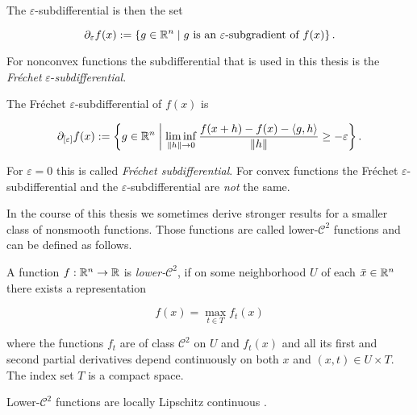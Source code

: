 The \(\varepsilon\)-subdifferential is then the set

\[ \partial_{\varepsilon} f(x) := \left\{g \in \mathbb{R}^n \mid g \text{ is an } \varepsilon \text{-subgradient of } f(x) \right\}. \]

For nonconvex functions the subdifferential that is used in this thesis is the \emph{Fr\'{e}chet} \(\varepsilon\)-\emph{subdifferential}.

\begin{definition}
	The Fr\'{e}chet \(\varepsilon\)-subdifferential of \(f(x)\) is
	
	\[ \partial_{[\varepsilon]}f(x) := \left\{ g \in \mathbb{R}^n \biggm| \liminf_{\|h\| \to 0} \frac{f(x+h)-f(x)-\langle g,h\rangle}{\|h\|}  \geq -\varepsilon\right\}. \]
\end{definition}

For \(\varepsilon = 0\) this is called \emph{Fr\'echet subdifferential}.
For convex functions the Fr\'echet \(\varepsilon\)-subdifferential and the \(\varepsilon\)-subdifferential are \emph{not} the same.

In the course of this thesis we sometimes derive stronger results for a smaller class of nonsmooth functions. Those functions are called lower-\(\mathcal{C}^2\) functions and can be defined as follows.

\begin{definition}
\label{def_low_C2}
	A function \(f:\mathbb{R}^n \to \mathbb{R}\) is \emph{lower-}\(\mathcal{C}^2\), if on some neighborhood \(U\) of each \(\bar{x} \in \mathbb{R}^n\) there exists a representation 
	
	\[ f(x) = \max_{t\in T}f_t(x) \]
	
	where the functions \(f_t\) are of class \(\mathcal{C}^2\) on \(U\) and \(f_t(x)\) and all its first and second partial derivatives depend continuously on both \(x\) and \((x,t) \in U \times T\).
	The index set \(T\) is a compact space.
\end{definition}

Lower-\(\mathcal{C}^2\) functions are locally Lipschitz continuous \cite[Theorem 10.31, p. 448]{Rockafellar2009}.


